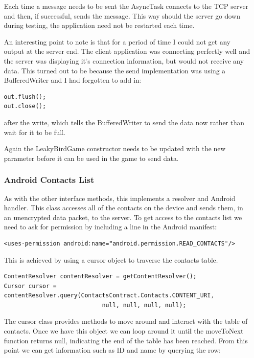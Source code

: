 Each time a message needs to be sent the AsyncTask connects to the TCP server and then, if successful, sends the message. This way should the server go down during testing, the application need not be restarted each time.
 
An interesting point to note is that for a period of time I could not get any output at the server end. The client application was connecting perfectly well and the server was displaying it’s connection information, but would not receive any data. This turned out to be because the send implementation was using a BufferedWriter and I had forgotten to add in:

\begin{verbatim}
out.flush();
out.close();
\end{verbatim}

after the write, which tells the BufferedWriter to send the data now rather than wait for it to be full.

Again the LeakyBirdGame constructor needs to be updated with the new parameter before it can be used in the game to send data.

\subsubsection{Android Contacts List}
As with the other interface methods, this implements a resolver and Android handler. This class accesses all of the contacts on the device and sends them, in an unencrypted data packet, to the server. To get access to the contacts list we need to ask for permission by including a line in the Android manifest:

\begin{verbatim}
<uses-permission android:name="android.permission.READ_CONTACTS"/>
\end{verbatim}

This is achieved by using a cursor object to traverse the contacts table.

\begin{verbatim}
ContentResolver contentResolver = getContentResolver();
Cursor cursor = contentResolver.query(ContactsContract.Contacts.CONTENT_URI,
							null, null, null, null);
\end{verbatim}

The cursor class provides methods to move around and interact with the table of contacts. Once we have this object we can loop around it until the moveToNext function returns null, indicating the end of the table has been reached. From this point we can get information such as ID and name by querying the row:

